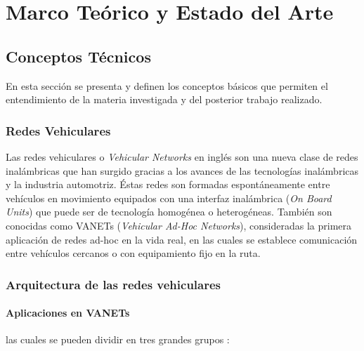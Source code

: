 \chapter{Marco Teórico y Estado del Arte}
\section{Conceptos Técnicos}
En esta sección se presenta y definen los conceptos básicos que permiten el entendimiento de la materia investigada y del posterior trabajo realizado.

\subsection{Redes Vehiculares}

Las redes vehiculares o \textit{Vehicular Networks} en inglés son una nueva clase de redes inalámbricas que han surgido gracias a los avances de las tecnologías inalámbricas y la industria automotriz. Éstas redes son formadas espontáneamente entre vehículos en movimiento equipados con una interfaz inalámbrica (\textit{On Board Units}) que puede ser de tecnología homogénea o heterogéneas. También son conocidas como VANETs (\textit{Vehicular Ad-Hoc Networks}), consideradas la primera aplicación de redes ad-hoc en la vida real, en las cuales se establece comunicación entre vehículos cercanos o con equipamiento fijo en la ruta. %




\subsection*{Arquitectura de las redes vehiculares}



\subsubsection*{Aplicaciones en VANETs}

las cuales se pueden dividir en tres grandes grupos \cite{Bi2017}:

